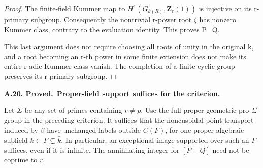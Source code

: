 \documentclass[11pt,a4paper]{article}
\newenvironment{claim}[3]{\par\medskip\noindent\hypertarget{#1}{\textbf{#1. #2.}}\ \textbf{#3.}\par\nopagebreak\smallskip\begingroup\itshape}{\endgroup\par\smallskip}
\begin{document}
\begin{proof}
The finite-field Kummer map to \(H^1(G_{k(R)},\mathbf{Z}_r(1))\) is injective on its r-primary subgroup. Consequently the nontrivial r-power root \({\zeta}\) has nonzero Kummer class, contrary to the evaluation identity. This proves P=Q.

This last argument does not require choosing all roots of unity in the original k, and a root becoming an r-th power in some finite extension does not make its entire r-adic Kummer class vanish. The completion of a finite cyclic group preserves its r-primary subgroup.


\end{proof}

\begin{claim}{A.20}{Proved}{Proper-field support suffices for the criterion}

Let $\Sigma$ be any set of primes containing $r\ne p$.
Use the full proper geometric pro-$\Sigma$ group in the preceding
criterion. It suffices that the noncuspidal point transport induced
by $\beta$ have unchanged labels outside $C(F)$, for one proper
algebraic subfield $k\subset F\subsetneq\bar k$. In particular,
an exceptional image supported over such an $F$ suffices, even if it
is infinite. The annihilating integer for $[P-Q]$ need not be
coprime to $r$.

\end{claim}
\end{document}
